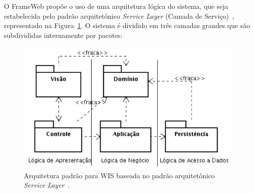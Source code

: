 O FrameWeb propõe o uso de uma arquitetura lógica do sistema, que seja estabelecida pelo padrão arquitetônico \textit{Service Layer} (Camada de Serviço)~\cite{fowler:peaa02}, representado na Figura~\ref{fig-ref-service-layer}. O sistema é dividido em três camadas grandes que são subdivididas internamente por pacotes:                            

\begin{figure}[h]
	\centering
	\includegraphics[scale=.6]{figuras/fig-ref-service-layer} 
	\caption{Arquitetura padrão para WIS baseada no padrão arquitetônico \textit{Service Layer}~\cite{fowler:peaa02}.}
	\label{fig-ref-service-layer}
\end{figure}

